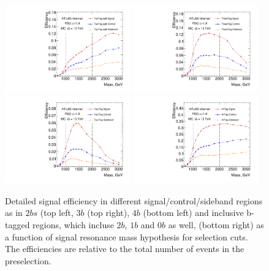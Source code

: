 \begin{figure}
\begin{center}
\includegraphics[width=0.48\textwidth,angle=-90]{figures/boosted/SigEff/region_2b_lst_Moriond_Efficiency_PreSel.pdf}
\includegraphics[width=0.48\textwidth,angle=-90]{figures/boosted/SigEff/region_3b_lst_Moriond_Efficiency_PreSel.pdf} \\
\includegraphics[width=0.48\textwidth,angle=-90]{figures/boosted/SigEff/region_4b_lst_Moriond_Efficiency_PreSel.pdf}
\includegraphics[width=0.48\textwidth,angle=-90]{figures/boosted/SigEff/region_alltag_lst_Moriond_Efficiency_PreSel.pdf} \\
  \caption{Detailed signal efficiency in different signal/control/sideband regions as in $2bs$ (top left, $3b$ (top right), $4b$ (bottom left) and inclusive b-tagged regions, which incluse $2b$, $1b$ and $0b$ as well, (bottom right) as a function of signal resonance mass hypothesis for selection cuts. The efficiencies are relative to the total number of events in the preselection.}
  \label{fig:boosted-selection-region-efficiency}
\end{center}
\end{figure}

